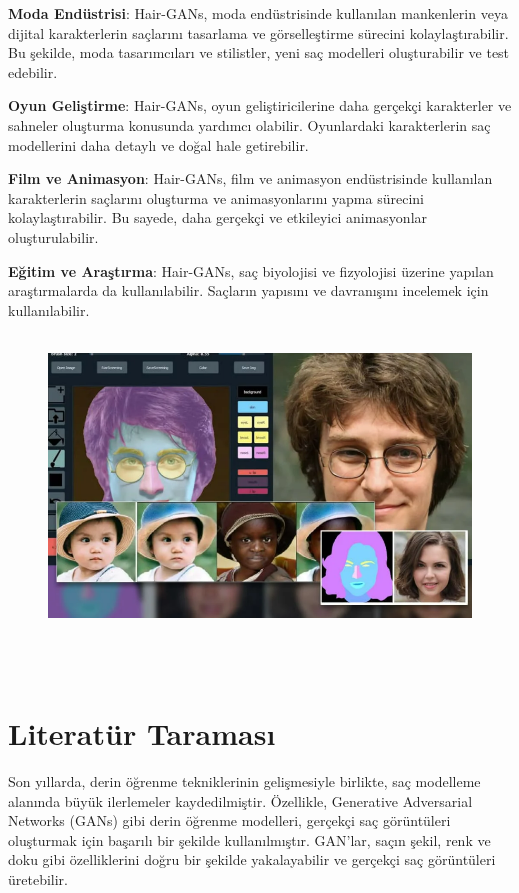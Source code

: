 \documentclass[12pt]{article}
\begin{document}
{\textbf{Moda Endüstrisi}}: Hair-GANs, moda endüstrisinde kullanılan mankenlerin veya dijital karakterlerin saçlarını tasarlama ve görselleştirme sürecini kolaylaştırabilir. Bu şekilde, moda tasarımcıları ve stilistler, yeni saç modelleri oluşturabilir ve test edebilir.

{\textbf{Oyun Geliştirme}}: Hair-GANs, oyun geliştiricilerine daha gerçekçi karakterler ve sahneler oluşturma konusunda yardımcı olabilir. Oyunlardaki karakterlerin saç modellerini daha detaylı ve doğal hale getirebilir.

{\textbf{Film ve Animasyon}}: Hair-GANs, film ve animasyon endüstrisinde kullanılan karakterlerin saçlarını oluşturma ve animasyonlarını yapma sürecini kolaylaştırabilir. Bu sayede, daha gerçekçi ve etkileyici animasyonlar oluşturulabilir.

{\textbf{Eğitim ve Araştırma}}: Hair-GANs, saç biyolojisi ve fizyolojisi üzerine yapılan araştırmalarda da kullanılabilir. Saçların yapısını ve davranışını incelemek için kullanılabilir.\cite{sofgan2022uniteai}
\begin{figure}[h]
    \centering
    \includegraphics[width=1\textwidth, height=8cm, keepaspectratio]{ornek.png}
    \label{fig:enter-label}
\end{figure}\\
\section{Literatür Taraması}
Son yıllarda, derin öğrenme tekniklerinin gelişmesiyle birlikte, saç modelleme alanında büyük ilerlemeler kaydedilmiştir. Özellikle, Generative Adversarial Networks (GANs) gibi derin öğrenme modelleri, gerçekçi saç görüntüleri oluşturmak için başarılı bir şekilde kullanılmıştır. GAN'lar, saçın şekil, renk ve doku gibi özelliklerini doğru bir şekilde yakalayabilir ve gerçekçi saç görüntüleri üretebilir.
\end{document}
